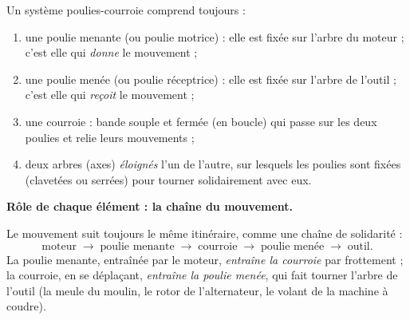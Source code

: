 \documentclass[11pt]{article}
\newcommand{\cle}[1]{{\popxbold\color{popdark}#1}}
\begin{document}
\begin{aretenir}
Un système poulies-courroie comprend toujours :
\begin{enumerate}
\item une \cle{poulie menante} (ou \cle{poulie motrice}) : elle est fixée sur l'arbre du moteur ; c'est elle qui \emph{donne} le mouvement ;
\item une \cle{poulie menée} (ou \cle{poulie réceptrice}) : elle est fixée sur l'arbre de l'outil ; c'est elle qui \emph{reçoit} le mouvement ;
\item une \cle{courroie} : bande souple et fermée (en boucle) qui passe sur les deux poulies et relie leurs mouvements ;
\item deux \cle{arbres} (axes) \emph{éloignés} l'un de l'autre, sur lesquels les poulies sont fixées (clavetées ou serrées) pour tourner solidairement avec eux.
\end{enumerate}
\end{aretenir}

\textbf{Rôle de chaque élément : la chaîne du mouvement.}

Le mouvement suit toujours le même itinéraire, comme une chaîne de solidarité :
\[
\text{moteur} \;\longrightarrow\; \text{poulie menante} \;\longrightarrow\; \text{courroie} \;\longrightarrow\; \text{poulie menée} \;\longrightarrow\; \text{outil}.
\]
La poulie menante, entraînée par le moteur, \emph{entraîne la courroie} par frottement ; la courroie, en se déplaçant, \emph{entraîne la poulie menée}, qui fait tourner l'arbre de l'outil (la meule du moulin, le rotor de l'alternateur, le volant de la machine à coudre).
\end{document}

